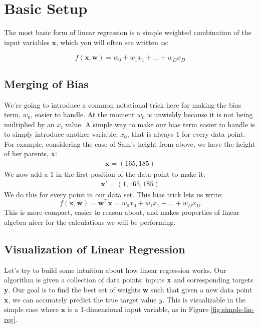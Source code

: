 \section{Basic Setup}
The most basic form of linear regression is a simple weighted combination of the input variables $\textbf{x}$, which you will often see written as:

\begin{equation}
    f(\textbf{x}, \textbf{w}) = w_{0} + w_{1}x_{1} + ... + w_{D}x_{D}
\end{equation}

\subsection{Merging of Bias}
We're going to introduce a common notational trick here for making the bias term, $w_{0}$, easier to handle. At the moment $w_{0}$ is unwieldy because it is not being multiplied by an $x_{i}$ value. A simple way to make our bias term easier to handle is to simply introduce another variable, $x_{0}$, that is always $1$ for every data point. For example, considering the case of Sam's height from above, we have the height of her parents, \textbf{x}:
\begin{align*}
    \textbf{x} = (165, 185)
\end{align*}
We now add a $1$ in the first position of the data point to make it:
\begin{align*}
    \textbf{x'} = (1, 165, 185)
\end{align*}
We do this for every point in our data set. This bias trick lets us write:
\begin{equation}
    f(\textbf{x}, \textbf{w}) = \textbf{w}^\top\textbf{x} = w_{0}x_{0} + w_{1}x_{1} + ... + w_{D}x_{D}
\end{equation}
This is more compact, easier to reason about, and makes properties of linear algebra nicer for the calculations we will be performing.

\subsection{Visualization of Linear Regression}
Let's try to build some intuition about how linear regression works. Our algorithm is given a collection of data points: inputs \textbf{x} and corresponding targets \textbf{y}. Our goal is to find the best set of weights \textbf{w} such that given a new data point \textbf{x}, we can accurately predict the true target value $y$. This is visualizable in the simple case where $\textbf{x}$ is a 1-dimensional input variable, as in Figure \ref{fig:simple-lin-reg}.

